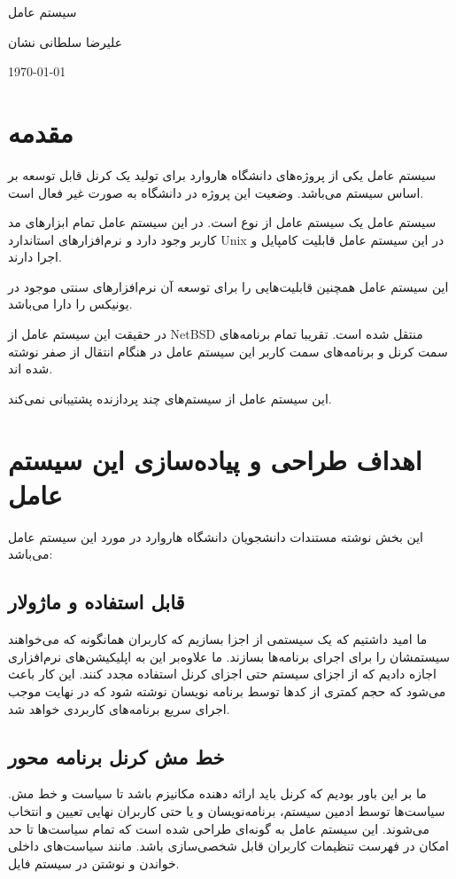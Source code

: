 \documentclass[20pt, a4paper]{article}
\begin{document}
\centerline{سیستم عامل }
\centerline{علیرضا سلطانی نشان}
\centerline{\today}
\tableofcontents

\section{مقدمه}

سیستم عامل  یکی از پروژه‌های دانشگاه هاروارد برای تولید یک کرنل قابل
توسعه بر اساس سیستم  می‌باشد. وضعیت این پروژه در دانشگاه به صورت غیر
فعال است.

سیستم عامل  یک سیستم عامل از نوع  است. در این سیستم عامل
تمام ابزار‌های مد کاربر وجود دارد و نرم‌افزار‌های استاندارد Unix در این سیستم
عامل قابلیت کامپایل و اجرا دارند.

این سیستم عامل همچنین قابلیت‌هایی را برای توسعه آن نرم‌افزار‌های سنتی موجود در
یونیکس را دارا می‌باشد.

در حقیقت این سیستم عامل از NetBSD منتقل شده است. تقریبا تمام برنامه‌های سمت کرنل
و برنامه‌های سمت کاربر این سیستم عامل در هنگام انتقال از صفر نوشته شده اند. 

این سیستم عامل از سیستم‌های چند پردازنده پشتیبانی نمی‌کند. 

\section{اهداف طراحی و پیاده‌سازی این سیستم عامل}

این بخش نوشته مستندات دانشجویان دانشگاه هاروارد در مورد این سیستم عامل می‌باشد:

\subsection{قابل استفاده و ماژولار}

ما امید داشتیم که یک سیستمی از اجزا بسازیم که کاربران همانگونه که می‌خواهند
سیستمشان را برای اجرای برنامه‌ها بسازند. ما علاوه‌بر این به اپلیکیشن‌های
نرم‌افزاری اجازه دادیم که از اجزای سیستم حتی اجزای کرنل استفاده مجدد کنند. این
کار باعث می‌شود که حجم کمتری از کد‌ها توسط برنامه نویسان نوشته شود که در نهایت
موجب اجرای سریع برنامه‌های کاربردی خواهد شد.

\subsection{خط مش کرنل برنامه محور}

ما بر این باور بودیم که کرنل باید ارائه دهنده مکانیزم باشد تا سیاست و خط مش.
سیاست‌ها توسط ادمین سیستم، برنامه‌نویسان و یا حتی کاربران نهایی تعیین و انتخاب
می‌شوند. این سیستم عامل به گونه‌ای طراحی شده است که تمام سیاست‌ها تا حد امکان در
فهرست تنظیمات کاربران قابل شخصی‌سازی باشد. مانند سیاست‌های داخلی خواندن و نوشتن
در سیستم فایل.
\end{document}
